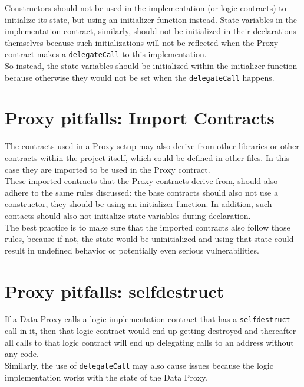 Constructors should not be used in the implementation (or logic contracts) to initialize its state, but using an initializer function instead. State variables in the implementation contract, similarly, should not be initialized in their declarations themselves because such initializations will not be reflected when the Proxy contract makes a \texttt{delegateCall} to this implementation. \\

So instead, the state variables should be initialized within the initializer function because otherwise they would not be set when the \texttt{delegateCall} happens.

\section{Proxy pitfalls: Import Contracts}
The contracts used in a Proxy setup may also derive from other libraries or other contracts within the project itself, which could be defined in other files. In this case they are imported to be used in the Proxy contract. \\

These imported contracts that the Proxy contracts derive from, should also adhere to the same rules discussed: the base contracts should also not use a constructor, they should be using an initializer function. In addition, such contacts should also not initialize state variables during declaration. \\

The best practice is to make sure that the imported contracts also follow those rules, because if not, the state would be uninitialized and using that state could result in undefined behavior or potentially even serious vulnerabilities.

\section{Proxy pitfalls: selfdestruct}
If a Data Proxy calls a logic implementation contract that has a \texttt{selfdestruct} call in it, then that logic contract would end up getting destroyed and thereafter all calls to that logic contract will end up delegating calls to an address without any code.\\

Similarly, the use of \texttt{delegateCall} may also cause issues because the logic implementation works with the state of the Data Proxy. \\

